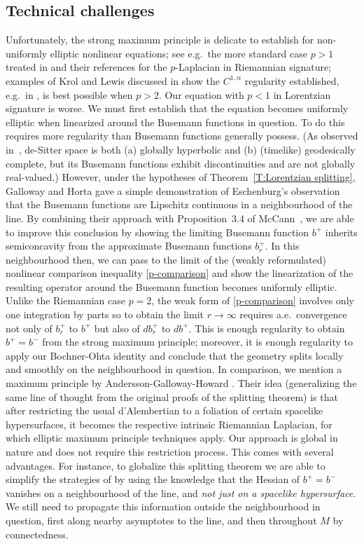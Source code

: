 \documentclass[12pt]{amsart}
\begin{document}
\subsection{Technical challenges} Unfortunately, the strong maximum principle is delicate to establish for non-uniformly elliptic nonlinear equations; see e.g.~the more standard case $p>1$ treated in 
\cite{GoffiPediconi21,PucciSerrin04} and their 
references for the $p$-Laplacian in Riemannian signature; 
examples of Krol and Lewis discussed in \cite{Lewis80} show the $C^{1,\alpha}$ regularity established, e.g.\ in \cite{diBenedetto83,Lewis83}, is best possible when $p>2$.  Our equation with $p<1$ in Lorentzian signature is worse.
We must first establish that the equation becomes uniformly elliptic when linearized around the Busemann functions in question. To do this requires more regularity than Busemann functions generally possess.
(As observed  in~\cite{GallowayHorta96}, de-Sitter space is both (a) globally hyperbolic and (b) (timelike) geodesically complete, but its Busemann functions exhibit discontinuities and are not globally real-valued.) However, under the hypotheses of Theorem~\ref{T:Lorentzian splitting},  Galloway and Horta gave a simple demonstration of Eschenburg's observation that the Busemann functions are Lipschitz continuous in a neighbourhood of the line.  By combining their approach with Proposition~3.4 of McCann~\cite{McCann20}, we are able to improve this conclusion by showing the limiting Busemann function $b^+$ inherits semiconcavity from the approximate Busemann functions $b^+_r$.   
In this neighbourhood then, we can pass to the limit of the (weakly reformulated) 
nonlinear comparison inequality \eqref{p-comparison} and show the linearization of the resulting operator around the Busemann function becomes uniformly elliptic. Unlike the Riemannian case $p=2$, the weak form of \eqref{p-comparison} involves only one integration by parts so to obtain the limit $r \to \infty$ requires a.e.\ convergence not only of $b_r^+$ to $b^+$ but also of $db_r^+$ to $db^+$. 
This is enough regularity to obtain $b^+=b^-$ from the strong maximum principle; moreover, it is enough regularity to apply our Bochner-Ohta identity and
 conclude that the geometry splits locally and smoothly on the neighbourhood in question. {In comparison, we mention a maximum principle by Andersson-Galloway-Howard \cite{AnderssonGallowayHoward98}. Their idea (generalizing the same line of thought from the original proofs of the splitting theorem) is that after restricting the usual d'Alembertian to a foliation of certain spacelike hypersurfaces, it becomes the respective intrinsic Riemannian Laplacian, for which elliptic maximum principle techniques apply. Our approach is global in nature and does not require this restriction process. This comes with several advantages. For instance, t}{o globalize this splitting theorem we are able to simplify the strategies of \cite{Eschenburg88,GallowayHorta96} by using the knowledge that the Hessian of $b^+=b^-$ vanishes on a neighbourhood of the line,  and \emph{not just on a spacelike hypersurface}.
 We still need to propagate this information outside the neighbourhood in question,  first along nearby asymptotes to the line, and then throughout $M$ by connectedness. 
 } 
 
\end{document}
